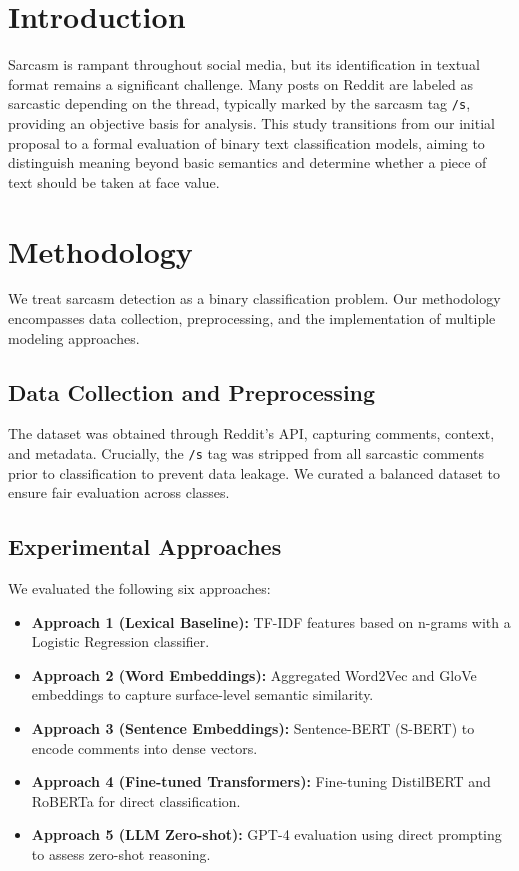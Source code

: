 \documentclass[sigconf]{acmart}
\begin{document}
\section{Introduction}
Sarcasm is rampant throughout social media, but its identification in textual format remains a significant challenge. Many posts on Reddit are labeled as sarcastic depending on the thread, typically marked by the sarcasm tag \texttt{/s}, providing an objective basis for analysis. This study transitions from our initial proposal to a formal evaluation of binary text classification models, aiming to distinguish meaning beyond basic semantics and determine whether a piece of text should be taken at face value.

\section{Methodology}
We treat sarcasm detection as a binary classification problem. Our methodology encompasses data collection, preprocessing, and the implementation of multiple modeling approaches.

\subsection{Data Collection and Preprocessing}
The dataset was obtained through Reddit's API, capturing comments, context, and metadata. Crucially, the \texttt{/s} tag was stripped from all sarcastic comments prior to classification to prevent data leakage. We curated a balanced dataset to ensure fair evaluation across classes.

\subsection{Experimental Approaches}
We evaluated the following six approaches:
\begin{itemize}
    \item \textbf{Approach 1 (Lexical Baseline):} TF-IDF features based on n-grams with a Logistic Regression classifier.
    \item \textbf{Approach 2 (Word Embeddings):} Aggregated Word2Vec and GloVe embeddings to capture surface-level semantic similarity.
    \item \textbf{Approach 3 (Sentence Embeddings):} Sentence-BERT (S-BERT) to encode comments into dense vectors.
    \item \textbf{Approach 4 (Fine-tuned Transformers):} Fine-tuning DistilBERT and RoBERTa for direct classification.
    \item \textbf{Approach 5 (LLM Zero-shot):} GPT-4 evaluation using direct prompting to assess zero-shot reasoning.
\end{itemize}
\end{document}

